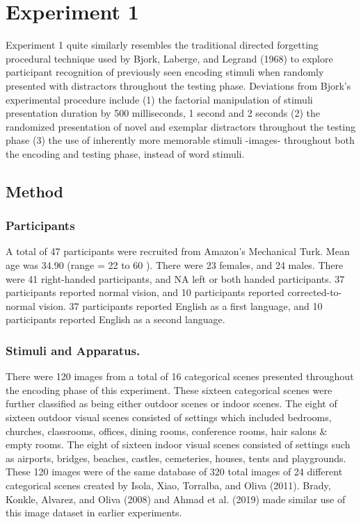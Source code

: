 \documentclass[
  man,floatsintext]{apa6}
\begin{document}
\hypertarget{experiment-1}{%
\section{Experiment 1}\label{experiment-1}}

Experiment 1 quite similarly resembles the traditional directed forgetting procedural technique used by Bjork, Laberge, and Legrand (1968) to explore participant recognition of previously seen encoding stimuli when randomly presented with distractors throughout the testing phase. Deviations from Bjork's experimental procedure include (1) the factorial manipulation of stimuli presentation duration by 500 milliseconds, 1 second and 2 seconds (2) the randomized presentation of novel and exemplar distractors throughout the testing phase (3) the use of inherently more memorable stimuli -images- throughout both the encoding and testing phase, instead of word stimuli.

\hypertarget{method}{%
\subsection{Method}\label{method}}

\hypertarget{participants}{%
\subsubsection{Participants}\label{participants}}

A total of 47 participants were recruited from Amazon's Mechanical Turk. Mean age was 34.90 (range = 22 to 60 ). There were 23 females, and 24 males. There were 41 right-handed participants, and NA left or both handed participants. 37 participants reported normal vision, and 10 participants reported corrected-to-normal vision. 37 participants reported English as a first language, and 10 participants reported English as a second language.

\hypertarget{stimuli-and-apparatus.}{%
\subsubsection{Stimuli and Apparatus.}\label{stimuli-and-apparatus.}}

There were 120 images from a total of 16 categorical scenes presented throughout the encoding phase of this experiment. These sixteen categorical scenes were further classified as being either outdoor scenes or indoor scenes. The eight of sixteen outdoor visual scenes consisted of settings which included bedrooms, churches, classrooms, offices, dining rooms, conference rooms, hair salons \& empty rooms. The eight of sixteen indoor visual scenes consisted of settings such as airports, bridges, beaches, castles, cemeteries, houses, tents and playgrounds. These 120 images were of the same database of 320 total images of 24 different categorical scenes created by Isola, Xiao, Torralba, and Oliva (2011). Brady, Konkle, Alvarez, and Oliva (2008) and Ahmad et al. (2019) made similar use of this image dataset in earlier experiments.
\end{document}
